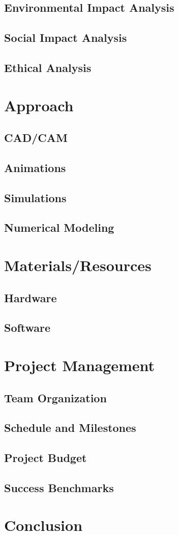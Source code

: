 \documentclass[12pt,titlepage]{article}
\begin{document}
\subsection{Environmental Impact Analysis}
\subsection{Social Impact Analysis}
\subsection{Ethical Analysis}

\section{Approach}
\subsection{CAD/CAM}
\subsection{Animations}
\subsection{Simulations}
\subsection{Numerical Modeling}

\section{Materials/Resources}
\subsection{Hardware}
\subsection{Software}

\section{Project Management}
\subsection{Team Organization}
\subsection{Schedule and Milestones}
\subsection{Project Budget}
\subsection{Success Benchmarks}

\clearpage
\section{Conclusion}



\end{document}
